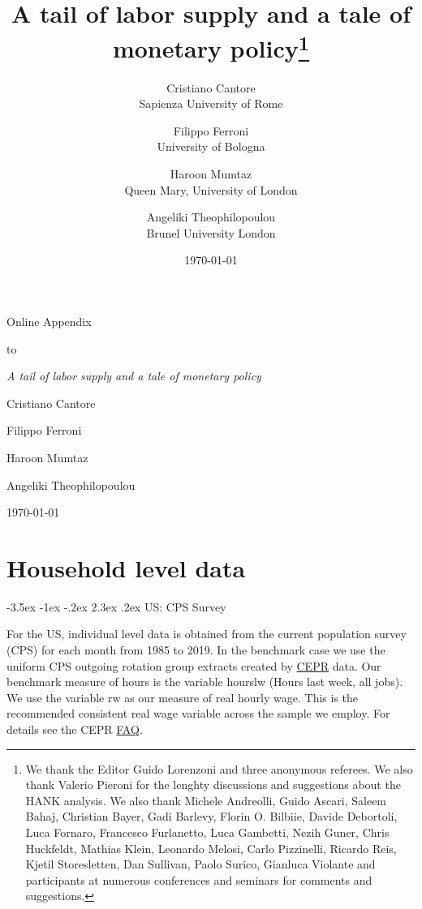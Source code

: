 \documentclass[a4paper,12pt]{article}%
\title{A tail of labor supply and a tale of monetary policy\thanks{We thank the Editor Guido Lorenzoni and three anonymous referees. We also thank Valerio Pieroni for the lenghty discussions and suggestions about the HANK analysis. We also thank Michele Andreolli, Guido Ascari, Saleem Bahaj, Christian Bayer, Gadi Barlevy,  Florin O. Bilbiie, Davide Debortoli, Luca Fornaro, Francesco Furlanetto,  Luca Gambetti, Nezih Guner, Chris Huckfeldt, Mathias Klein, Leonardo Melosi, Carlo Pizzinelli,  Ricardo Reis, Kjetil Storesletten, Dan Sullivan,  Paolo Surico, Gianluca Violante and participants at numerous conferences and seminars for comments and suggestions.
}}
\author{Cristiano Cantore \\ Sapienza University of Rome
\and
Filippo Ferroni \\ University of Bologna
\and 
Haroon Mumtaz\\ Queen Mary, University of London
\and 
Angeliki Theophilopoulou\\Brunel University London
}
\date{\today \\[.5ex] 
       }
\makeatletter
\renewcommand\subsection{\@startsection {subsection}{2}{\z@}%
                  {-3.5ex \@plus -1ex \@minus -.2ex}%
                  {2.3ex \@plus.2ex}%
                  {\centering\normalsize\scshape\color{black}}}
\makeatother
\begin{document}

\begin{titlepage}
\centering
\vspace*{\fill}
{\LARGE Online Appendix\par}
\vspace{0.8cm}
{\large to\par}
\vspace{0.8cm}
{\LARGE\itshape A tail of labor supply and a tale of monetary policy\par}
\vspace{1.5cm}
{\large Cristiano Cantore\par}
{\large Filippo Ferroni\par}
{\large Haroon Mumtaz\par}
{\large Angeliki Theophilopoulou\par}
\vspace{1.2cm}
{\large \today\par}
\vspace*{\fill}
\end{titlepage}
\clearpage
{}

\appendix
\renewcommand\thefigure{\thesection.\arabic{figure}}    
\renewcommand\thetable{\thesection.\arabic{table}}    
\renewcommand\theequation{\thesection.\arabic{equation}}    
\renewcommand\thetheorem{\thesection.\arabic{theorem}}   


\section{Household level data}\label{App:Data}


\subsection{US: CPS Survey}\label{App:Data:US:CPS}


For the US, individual level data is obtained from the current
population survey (CPS) for each month from 1985 to 2019. In the benchmark case we use the uniform CPS outgoing rotation group extracts created by \href{https://ceprdata.org/}{CEPR} data. Our benchmark measure of hours is the variable hourslw (Hours last week, all jobs). We use the variable rw as our measure of real hourly wage. This is the recommended consistent real wage variable across the sample we employ. For details see the CEPR \href{https://ceprdata.org/cps-uniform-data-extracts/cps-outgoing-rotation-group/cps-org-faq}{FAQ}.
\end{document}
